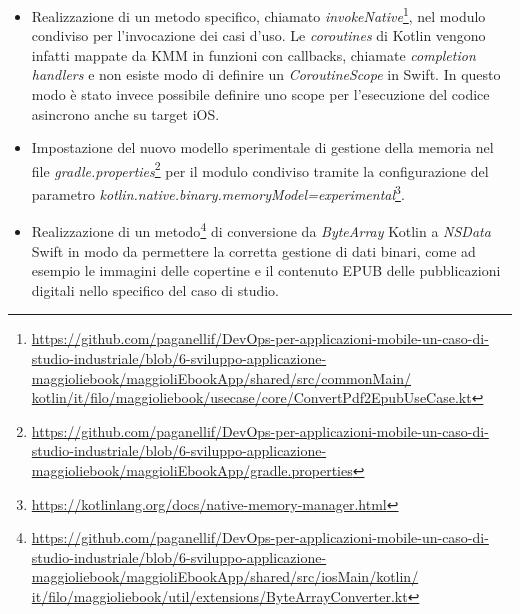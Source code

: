 \begin{itemize}
    \item Realizzazione di un metodo specifico, chiamato \textit{invokeNative}\footnote{\href{https://github.com/paganellif/DevOps-per-applicazioni-mobile-un-caso-di-studio-industriale/blob/6-sviluppo-applicazione-maggioliebook/maggioliEbookApp/shared/src/commonMain/kotlin/it/filo/maggioliebook/usecase/core/ConvertPdf2EpubUseCase.kt}{https://github.com/paganellif/DevOps-per-applicazioni-mobile-un-caso-di-studio-industriale/blob/6-sviluppo-applicazione-maggioliebook/maggioliEbookApp/shared/src/commonMain/\\kotlin/it/filo/maggioliebook/usecase/core/ConvertPdf2EpubUseCase.kt}}, nel modulo condiviso per l'invocazione dei casi d'uso. Le \textit{coroutines} di Kotlin vengono infatti mappate da KMM in funzioni con callbacks, chiamate \textit{completion handlers} e non esiste modo di definire un \textit{CoroutineScope} in Swift. In questo modo è stato invece possibile definire uno scope per l'esecuzione del codice asincrono anche su target iOS.
    
    \item Impostazione del nuovo modello sperimentale di gestione della memoria nel file \textit{gradle.properties}\footnote{\href{https://github.com/paganellif/DevOps-per-applicazioni-mobile-un-caso-di-studio-industriale/blob/6-sviluppo-applicazione-maggioliebook/maggioliEbookApp/gradle.properties}{https://github.com/paganellif/DevOps-per-applicazioni-mobile-un-caso-di-studio-industriale/blob/6-sviluppo-applicazione-maggioliebook/maggioliEbookApp/gradle.properties}} per il modulo condiviso tramite la configurazione del parametro \textit{kotlin.native.binary.memoryModel=experimental}\footnote{\href{https://kotlinlang.org/docs/native-memory-manager.html}{https://kotlinlang.org/docs/native-memory-manager.html}}.
    
    \item Realizzazione di un metodo\footnote{\href{https://github.com/paganellif/DevOps-per-applicazioni-mobile-un-caso-di-studio-industriale/blob/6-sviluppo-applicazione-maggioliebook/maggioliEbookApp/shared/src/iosMain/kotlin/it/filo/maggioliebook/util/extensions/ByteArrayConverter.kt}{https://github.com/paganellif/DevOps-per-applicazioni-mobile-un-caso-di-studio-industriale/blob/6-sviluppo-applicazione-maggioliebook/maggioliEbookApp/shared/src/iosMain/kotlin/\\it/filo/maggioliebook/util/extensions/ByteArrayConverter.kt}} di conversione da \textit{ByteArray} Kotlin a \textit{NSData} Swift in modo da permettere la corretta gestione di dati binari, come ad esempio le immagini delle copertine e il contenuto EPUB delle pubblicazioni digitali nello specifico del caso di studio.
    

\end{itemize}
